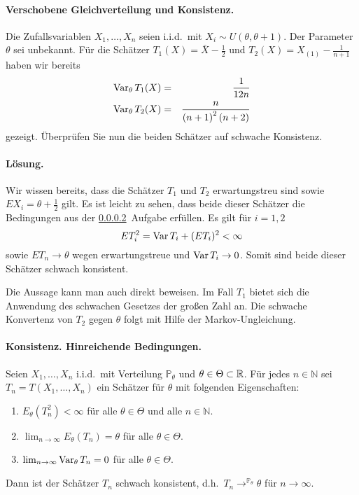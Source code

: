 \paragraph{Verschobene Gleichverteilung und Konsistenz.} 
Die Zufallsvariablen $X_1,\ldots,X_n$ seien i.i.d.\ mit $X_i\sim U(\theta,\theta+1)$.
Der Parameter $\theta$ sei unbekannt. Für die Schätzer $T_1(X) = \bar X -\frac{1}{2}$
und $T_2(X)=X_{(1)} - \frac{1}{n+1}$ haben wir bereits
\begin{eqnarray}
    \operatorname{Var}_\theta T_1(X) &=& \frac{1}{12 n} \\
    \operatorname{Var}_\theta T_2(X) &=& \frac{n}{\left( n+1 \right)^2\left( n+2 \right)}
\end{eqnarray}
gezeigt. Überprüfen Sie nun die beiden Schätzer auf schwache Konsistenz.

\paragraph*{Lösung.} Wir wissen bereits, dass die Schätzer $T_1$ und $T_2$ erwartungstreu sind 
sowie $E X_i = \theta + \frac{1}{2}$ gilt. Es ist leicht zu sehen, dass beide dieser Schätzer
die Bedingungen aus der \ref{Konsistenz-Hinreichende-Bedingungen}\ Aufgabe erfüllen. 
Es gilt für $i=1,2$
\begin{equation}
    E T_i^2 = \operatorname{Var} T_i + (E T_i)^2 <\infty
\end{equation}
sowie $E T_n \to \theta$ wegen erwartungstreue und $\operatorname{Var} T_i \to 0$. Somit sind beide dieser
Schätzer schwach konsistent.

Die Aussage kann man auch direkt  beweisen. Im Fall $T_1$ bietet sich die Anwendung
des schwachen Gesetzes der großen Zahl an. Die schwache Konvertenz von $T_2$ gegen $\theta$ 
folgt mit Hilfe der Markov-Ungleichung.





\paragraph{Konsistenz. Hinreichende Bedingungen. }\label{Konsistenz-Hinreichende-Bedingungen}
Seien $X_1,\ldots,X_n$ i.i.d.\ mit Verteilung $\mathbb P_\theta$ und $\theta\in\Theta\subset\mathbb R$.
Für jedes $n\in\mathbb N$ sei $T_n = T(X_1,\ldots,X_n)$ ein Schätzer für $\theta$ mit 
folgenden Eigenschaften:
\begin{enumerate}
    \item $E_\theta(T^2_n)< \infty$ für alle $\theta\in\Theta$ und alle $n\in\mathbb N$.
    \item $\lim_{n\to\infty}E_\theta(T_n) = \theta$ für alle $\theta\in\Theta$.
    \item $\lim_{n\to\infty} \operatorname{Var}_\theta T_n = 0$ für alle $\theta\in\Theta$.
\end{enumerate}
Dann ist der Schätzer $T_n$ schwach konsistent, d.h.\ $T_n \to^{\mathbb P_\theta} \theta$
für $n\to\infty$.

